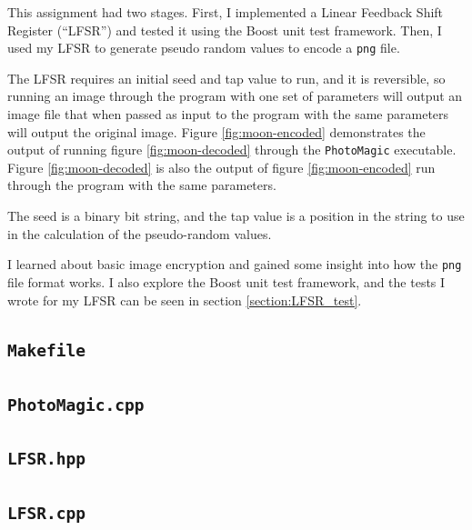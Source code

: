 \documentclass[12pt]{article}
\begin{document}
This assignment had two stages. First, I implemented a Linear Feedback Shift Register (``LFSR'') and tested it using the Boost unit test framework. Then, I used my LFSR to generate pseudo random values to encode a \texttt{png} file.

The LFSR requires an initial seed and tap value to run, and it is reversible, so running an image through the program with one set of parameters will output an image file that when passed as input to the program with the same parameters will output the original image. Figure \ref{fig:moon-encoded} demonstrates the output of running figure \ref{fig:moon-decoded} through the \texttt{PhotoMagic} executable. Figure \ref{fig:moon-decoded} is also the output of figure \ref{fig:moon-encoded} run through the program with the same parameters.

The seed is a binary bit string, and the tap value is a position in the string to use in the calculation of the pseudo-random values.

I learned about basic image encryption and gained some insight into how the \texttt{png} file format works. I also explore the Boost unit test framework, and the tests I wrote for my LFSR can be seen in section \ref{section:LFSR_test}.

\subsection{\texttt{Makefile}}



\subsection{\texttt{PhotoMagic.cpp}}



\subsection{\texttt{LFSR.hpp}}



\subsection{\texttt{LFSR.cpp}}


\end{document}

